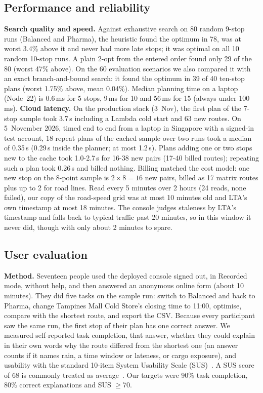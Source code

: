 \documentclass[10.5pt,a4paper]{article}
\begin{document}
\subsection{Performance and reliability}
\textbf{Search quality and speed.} Against exhaustive search on 80 random 9-stop runs (Balanced and Pharma), the heuristic
found the optimum in 78, was at worst 3.4\% above it and never had more late stops; it was optimal on all 10 random 10-stop
runs. A plain 2-opt from the entered order found only 29 of the 80 (worst 47\% above). On the 60 evaluation scenarios we
also compared it with an exact branch-and-bound search: it found the optimum in 39 of 40 ten-stop plans (worst 1.75\%
above, mean 0.04\%). Median planning time on a laptop (Node~22) is 0.6\,ms for 5 stops, 9\,ms for 10 and
56\,ms for 15 (always under 100\,ms). \textbf{Cloud latency.} On the production stack (3~Nov), the first plan of the 7-stop sample took 3.7\,s including a Lambda
cold start and 63 new routes. On 5~November 2026, timed end to end from a laptop in Singapore with a
signed-in test account, 18 repeat plans of the cached sample over two runs took a median of 0.35\,s (0.29\,s inside the
planner; at most 1.2\,s). Plans adding one or two stops new to the cache took 1.0-2.7\,s for 16-38 new pairs (17-40 billed
routes); repeating such a plan took 0.26\,s and billed nothing. Billing matched the cost model: one new stop on the 8-point
sample is $2\times8=16$ new pairs, billed as 17 matrix routes plus up to 2 for road lines. Read every 5 minutes over
2 hours (24 reads, none failed), our copy of the road-speed grid was at most 10 minutes old and LTA's own timestamp at most
18 minutes. The console judges staleness by LTA's timestamp and falls back to typical traffic past 20 minutes, so in
this window it never did, though with only about 2 minutes to spare.

\subsection{User evaluation}
\textbf{Method.} Seventeen people used the deployed console signed out, in Recorded mode, without help, and then
answered an anonymous online form (about 10 minutes). They did five tasks on the sample run: switch to Balanced and back to
Pharma, change Tampines Mall Cold Store's closing time to 11:00, optimise, compare with the shortest route,
and export the CSV. Because every participant saw the same run, the first stop of their plan has one correct answer. We
measured self-reported task completion, that answer, whether they could explain in their own words why the route differed
from the shortest one (an answer counts if it names rain, a time window or lateness, or cargo exposure), and usability with the standard 10-item System Usability Scale (SUS)~\cite{sus}. A SUS score of
68 is commonly treated as average~\cite{bangor}. Our targets were 90\% task completion, 80\% correct explanations and
SUS $\ge$70.
\end{document}
